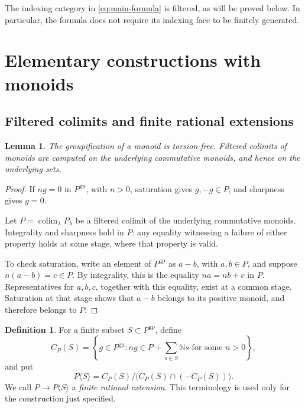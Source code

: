 \documentclass[11pt]{article}
\newtheorem{lemma}[theorem]{Lemma}
\theoremstyle{definition}
\newtheorem{definition}[theorem]{Definition}
\theoremstyle{remark}
\DeclareMathOperator{\colim}{colim}
\newcommand{\gp}{\mathrm{gp}}
\newcommand{\NN}{\mathbb N}
\begin{document}
The indexing category in \eqref{eq:main-formula} is filtered, as will
be proved below. In particular, the formula does not require its
indexing face to be finitely generated.

\section{Elementary constructions with monoids}

\subsection{Filtered colimits and finite rational extensions}

\begin{lemma}\label{lem:filtered}
The groupification of a monoid is torsion-free. Filtered colimits of
monoids are computed on the underlying commutative monoids, and hence
on the underlying sets.
\end{lemma}

\begin{proof}
If \(ng=0\) in \(P^{\gp}\), with \(n>0\), saturation gives
\(g,-g\in P\), and sharpness gives \(g=0\).

Let \(P=\colim_\lambda P_\lambda\) be a filtered colimit of the
underlying commutative monoids. Integrality and sharpness hold in
\(P\): any equality witnessing a failure of either property holds at
some stage, where that property is valid.

To check saturation, write an element of \(P^{\gp}\) as \(a-b\), with
\(a,b\in P\), and suppose \(n(a-b)=c\in P\). By integrality, this is
the equality \(na=nb+c\) in \(P\). Representatives for \(a,b,c\),
together with this equality, exist at a common stage. Saturation at
that stage shows that \(a-b\) belongs to its positive monoid, and
therefore belongs to \(P\).
\end{proof}

\begin{definition}\label{def:rational}
For a finite subset \(S\subset P^{\gp}\), define
\[
C_P(S)=
\left\{g\in P^{\gp}:
ng\in P+\sum_{s\in S}\NN s
\text{ for some }n>0\right\},
\]
and put
\[
P\langle S\rangle=
C_P(S)/\bigl(C_P(S)\cap(-C_P(S))\bigr).
\]
We call \(P\to P\langle S\rangle\) a \emph{finite rational extension}.
This terminology is used only for the construction just specified.
\end{definition}
\end{document}

